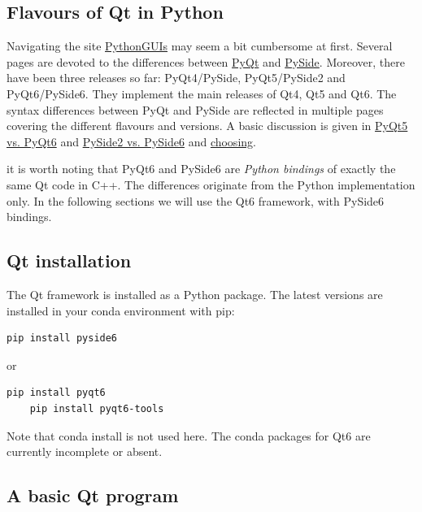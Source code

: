 \subsection{Flavours of Qt in Python}

Navigating the site \href{https://www.pythonguis.com/}{PythonGUIs} may seem a bit cumbersome at first. Several pages are devoted to the differences between \href{https://en.wikipedia.org/wiki/PyQt}{PyQt} and \href{https://en.wikipedia.org/wiki/PySide}{PySide}. Moreover, there have been three releases so far: PyQt4/PySide, PyQt5/PySide2 and PyQt6/PySide6. They implement the main releases of Qt4, Qt5 and Qt6. The syntax differences between PyQt and PySide are reflected in multiple pages covering the different flavours and versions. A basic discussion is given in \href{https://www.pythonguis.com/faq/pyqt5-vs-pyqt6/}{PyQt5 vs. PyQt6} and \href{https://www.pythonguis.com/faq/pyside2-vs-pyside6/}{PySide2 vs. PySide6} and \href{https://www.pythonguis.com/faq/which-python-gui-library/}{choosing}.

it is worth noting that PyQt6 and PySide6 are \emph{Python  bindings} of exactly the same Qt code in C++. The differences originate from the Python implementation only.
In the following sections we will use the Qt6 framework, with PySide6 bindings.

\subsection{Qt installation}

The Qt framework is installed as a Python package. The latest versions are installed in your conda environment with \textsf{pip}:

\begin{lstlisting}[style=DOS]
	pip install pyside6
\end{lstlisting}
or 
\begin{lstlisting}[style=DOS]
	pip install pyqt6
	pip install pyqt6-tools
\end{lstlisting}

Note that \textsf{conda install} is not used here. The \textsf{conda} packages for Qt6 are currently incomplete or absent.

\subsection{A basic Qt program}

